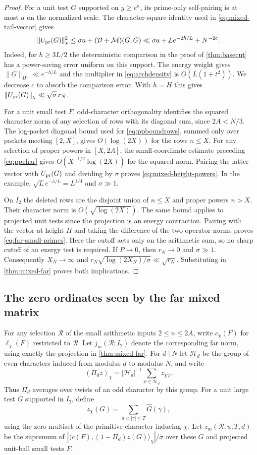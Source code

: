 \documentclass[11pt,a4paper]{article}
\numberwithin{equation}{section}
\begin{document}
\begin{proof}
For a unit test $G$ supported on $y\ge e^h$, its prime-only
self-pairing is at most $a$ on the normalized scale. The
character-square identity used in \cref{eq:mixed-tail-vector} gives
\[
 \|U_{\rm pr}(G)\|_\chi^2
 \le \sigma a+(\mathcal D+\mathcal M)(G,G)
 \ll \sigma a+L e^{-2h/L}+N^{-2c}.
\]
Indeed, for $h\ge3L/2$ the deterministic comparison in the proof of
\cref{thm:basecut} has a power-saving error uniform on this support.
The energy weight gives $\|G\|_{H^1}\ll e^{-h/L}$ and the multiplier
in \eqref{eq:archdensity} is $O(L(1+t^2))$. We decrease $c$ to
absorb the comparison error. With $h=H$ this gives
$\|U_{\rm pr}(G)\|_\chi\ll\sqrt\sigma\,r_N$.

For a unit small test $F$, odd-character orthogonality identifies the
squared character norm of any selection of rows with its diagonal
sum, since $2A<N/3$. The log-packet diagonal bound used for
\eqref{eq:ppboundrows}, summed only over packets meeting $[2,X]$,
gives $O(\log(2X))$ for the rows $n\le X$. For any selection of
proper powers in $[X,2A]$, the small-coordinate estimate preceding
\eqref{eq:ppchar} gives $O(X^{-1/2}\log(2X))$ for the squared
norm. Pairing the latter vector with $U_{\rm pr}(G)$ and dividing
by $\sigma$ proves \eqref{eq:mixed-height-powers}. In the example,
$\sqrt L e^{-h/L}=L^{1/4}$ and $\sigma\gg1$.

On $I_2$ the deleted rows are the disjoint union of $n\le X$ and
proper powers $n>X$. Their character norm is
$O(\sqrt{\log(2X)})$. The same bound applies to projected unit
tests since the projection is an energy contraction. Pairing with
the vector at height $H$ and taking the difference of the two
operator norms proves \eqref{eq:far-small-primes}. Here the cutoff
acts only on the arithmetic sum, so no sharp cutoff of an energy
test is required. If $P\to0$, then $r_N\to0$ and $\sigma\gg1$.
Consequently $X_N\to\infty$ and
$r_N\sqrt{\log(2X_N)/\sigma}\ll\sqrt{r_N}$. Substituting in
\cref{thm:mixed-far} proves both implications.
\end{proof}

\subsection{The zero ordinates seen by the far mixed matrix}

For any selection $\mathcal R$ of the small arithmetic inputs
$2\le n\le2A$, write $c_\chi(F)$ for $\ell_\chi(F)$ restricted
to $\mathcal R$. Let $j_m(\mathcal R;I_2)$ denote the corresponding
far norm, using exactly the projection in \cref{thm:mixed-far}.
For $d\mid N$ let $\mathcal H_d$ be the group of even characters
induced from modulus $d$ to modulus $N$, and write
\[
 (\Pi_d z)_\chi=|\mathcal H_d|^{-1}\sum_{\psi\in\mathcal H_d}
                         z_{\chi\psi}.
\]
Thus $\Pi_d$ averages over twists of an odd character by this group.
For a unit large test $G$ supported in $I_2$, define
\[
 z_\chi(G)=\sum_{u<|\gamma|\le T}\widehat G(\gamma),
\]
using the zero multiset of the primitive character inducing $\chi$.
Let $z_m(\mathcal R;u,T,d)$ be the supremum of
$|\langle c(F),(1-\Pi_d)z(G)\rangle_\chi|/\sigma$ over these
$G$ and projected unit-ball small tests $F$.
\end{document}
